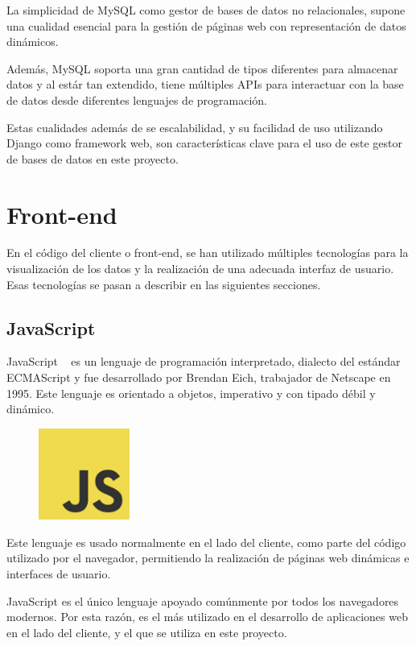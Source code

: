 \documentclass[a4paper, spanish, 12pt]{book}
\begin{document}
La simplicidad de MySQL como gestor de bases de datos no relacionales, supone una
cualidad esencial para la gesti\'on de p\'aginas web con representaci\'on de datos
din\'amicos.

Adem\'as, MySQL soporta una gran cantidad de tipos diferentes para almacenar datos
y al est\'ar tan extendido, tiene m\'ultiples APIs para interactuar con la base de datos desde
diferentes lenguajes de programaci\'on.

Estas cualidades adem\'as de se escalabilidad, y su facilidad de uso utilizando Django
como framework web, son caracter\'isticas clave para el uso de este gestor de bases
de datos en este proyecto.

\section{Front-end}
\label{sec:front-end}

En el c\'odigo del cliente o front-end, se han utilizado m\'ultiples tecnolog\'ias
para la visualizaci\'on de los datos y la realizaci\'on de una adecuada interfaz
de usuario. Esas tecnolog\'ias se pasan a describir en las siguientes secciones.

\subsection{JavaScript}
\label{subsec:js}

JavaScript ~\cite{js} es un lenguaje de programaci\'on interpretado, dialecto del est\'andar
ECMAScript y fue desarrollado por Brendan Eich, trabajador de Netscape en 1995.
Este lenguaje es orientado a objetos, imperativo y con tipado d\'ebil y din\'amico.

\begin{figure}[H]
  \centering
  \includegraphics[width=3cm, keepaspectratio]{img/js-logo}
\end{figure}

Este lenguaje es usado normalmente en el lado del cliente, como parte del c\'odigo
utilizado por el navegador, permitiendo la realizaci\'on de p\'aginas web din\'amicas
e interfaces de usuario.

JavaScript es el \'unico lenguaje apoyado com\'unmente por todos los navegadores modernos.
Por esta raz\'on, es el m\'as utilizado en el desarrollo de aplicaciones web en el
lado del cliente, y el que se utiliza en este proyecto.
\end{document}
